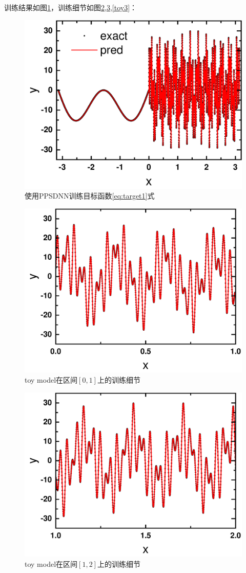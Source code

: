   训练结果如图\ref{sin}，训练细节如图\ref{toy1},\ref{toy2},\ref{toy3}：
\begin{figure}[htbp!]
  \centering
  \includegraphics[width=0.77\linewidth]{figures/toymodel/train.pdf}
  \caption{使用PPSDNN训练目标函数\ref{eq:target1}式}
  \label{sin}
\end{figure}
\begin{figure}[htbp]
  \centering
  \includegraphics[width=0.76\linewidth]{figures/toymodel/train1.pdf}
  \caption{toy model在区间$[0,1]$上的训练细节}
  \label{toy1}
\end{figure}
\begin{figure}[htbp]
  \centering
  \includegraphics[width=0.76\linewidth]{figures/toymodel/train2.pdf}
  \caption{toy model在区间$[1,2]$上的训练细节}
  \label{toy2}
\end{figure}
